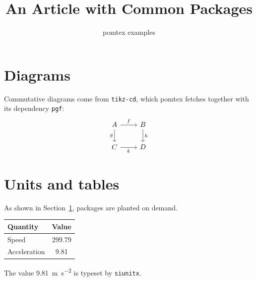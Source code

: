 \documentclass[11pt]{article}
\title{An Article with Common Packages}
\author{pomtex examples}
\date{}
\begin{document}
\maketitle

\section{Diagrams}\label{sec:diagrams}
Commutative diagrams come from \texttt{tikz-cd}, which pomtex fetches together
with its dependency \texttt{pgf}:
\[
\begin{tikzcd}
  A \arrow[r, "f"] \arrow[d, "g"'] & B \arrow[d, "h"] \\
  C \arrow[r, "k"']                 & D
\end{tikzcd}
\]

\section{Units and tables}
As shown in Section~\ref{sec:diagrams}, packages are planted on demand.
\begin{center}
\begin{tabular}{lS[table-format=3.2]}
  \toprule
  Quantity     & {Value} \\
  \midrule
  Speed        & 299.79 \\
  Acceleration &   9.81 \\
  \bottomrule
\end{tabular}
\end{center}
The value \qty{9.81}{\metre\per\second\squared} is typeset by \texttt{siunitx}.
\end{document}
